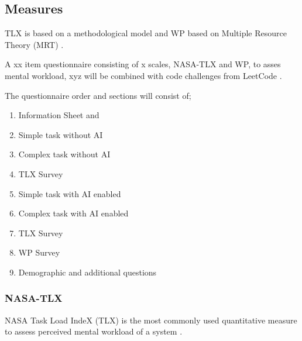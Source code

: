 \documentclass[man]{apa7}
\begin{document}
\subsection{Measures}
TLX is based on a methodological model and WP based on Multiple Resource Theory (MRT) \parencite{Wickens1984ProcessingAttention, Wickens2008MultipleWorkload, Wickens2020ProcessingAttention}.

A xx item questionnaire consisting of x scales, NASA-TLX and WP, to asses mental workload, xyz will be combined with code challenges from LeetCode \parencite{ProblemsLeetCode}.


The questionnaire order and sections will consist of;
\begin{enumerate}
    \item Information Sheet and 
    \item Simple task without AI
    \item Complex task without AI
    \item TLX Survey
    \item Simple task with AI enabled
    \item Complex task with AI enabled
    \item TLX Survey
    \item WP Survey
    \item Demographic and additional questions
\end{enumerate}

\subsubsection{NASA-TLX}
NASA Task Load IndeX (TLX) \parencite{Hart1988DevelopmentResearch} is the most commonly used quantitative measure to assess perceived mental workload of a system \parencite{Longo2022HumanDefinition}. 
\end{document}
